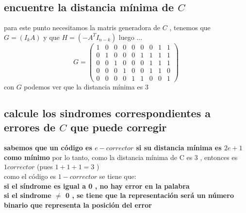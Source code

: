 \documentclass[10pt,a4paper]{article} %
\begin{document}
        \subsection{encuentre la distancia mínima de $C$}
        para este punto necesitamos la matris generadora de $C$ , tenemos que
        $G = (I_k A)$ y que $H = (-A ^{T} I_{n-k})$ luego ...
        \begin{equation}
            G = \begin{pmatrix}
                1 & 0 & 0 & 0 & 0 & 0 & 0 & 1 & 1
                \\
                0 & 1 & 0 & 0 & 0 & 1 & 1 & 1 & 1
                \\
                0 & 0 & 1 & 0 & 0 & 0 & 1 & 1 & 1
                \\
                0 & 0 & 0 & 1 & 0 & 0 & 1 & 1 & 0
                \\
                0 & 0 & 0 & 0 & 1 & 1 & 0 & 0 & 1
            \end{pmatrix}
        \end{equation}
        con $G$ podemos ver que la distancia mínima es $3$

        \subsection{calcule los sindromes correspondientes a errores de
            $C$ que puede corregir}

            \textbf{sabemos que un código es $e-corrector$ si su distancia
            mínima es $2e +1$ como mínimo} por lo tanto, como la distancia
            mínima de C es 3 , entonces es $1 corrector$ (pues $1+1+1 = 3$ )
            \\
            como el código es $1-corrector$ se tiene que:
            \\
            \textbf{si el síndrome es igual a 0 , no hay error en la palabra}
            \\
            \textbf{si el sindrome $\not= $ 0 , se tiene que la representación
            será un número binario que representa la posición del error}

\end{document}
